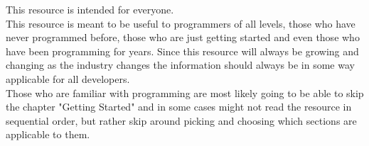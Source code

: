 This resource is intended for everyone.
\newline
\\
This resource is meant to be useful to programmers of all levels, those who have never programmed before, those who are just
getting started and even those who have been programming for years.
Since this resource will always be growing and changing as the industry changes the information should always be in some
way applicable for all developers.
\newline
\\
Those who are familiar with programming are most likely going to be able to skip the chapter "Getting Started" and in
some cases might not read the resource in sequential order, but rather skip around picking and choosing which sections are
applicable to them.
